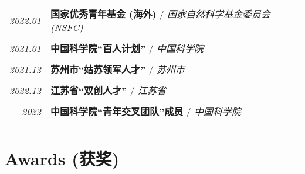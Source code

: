 \documentclass[paper=a4,fontsize=11pt]{scrartcl}
\begin{document}
\begin{longtable}{r|p{11cm}}
	
	\emph{2022.01} & \textbf{国家优秀青年基金 (海外)} / \emph{国家自然科学基金委员会 (NSFC)}\\
	\multicolumn{2}{c}{} \\
	
	\emph{2021.01} & \textbf{中国科学院``百人计划''} / \emph{中国科学院}\\
	\multicolumn{2}{c}{} \\
	
	
	\emph{2021.12} & \textbf{苏州市``姑苏领军人才''} / \emph{苏州市}\\
	\multicolumn{2}{c}{} \\

	\emph{2022.12} & \textbf{江苏省``双创人才''} / \emph{江苏省}\\
	\multicolumn{2}{c}{} \\
	
	\emph{2022} & \textbf{中国科学院``青年交叉团队''成员} / \emph{中国科学院}\\
	\multicolumn{2}{c}{} 
	
\end{longtable}


\section*{Awards (获奖)}
\end{document}
